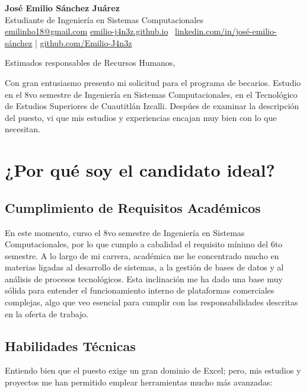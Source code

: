 \documentclass[letterpaper,11pt]{article}
\begin{document}
\begin{center}
\textbf{\Large José Emilio Sánchez Juárez} \\
\vspace{0.2cm}
Estudiante de Ingeniería en Sistemas Computacionales \\
\href{mailto:emilinho18@gmail. com}{emilinho18@gmail.com} \href{https://emilio-j4n3z.github.io}{emilio-j4n3z.github.io} \
\href{https://linkedin.com/in/josé-emilio-sánchez}{linkedin.com/in/josé-emilio-sánchez} | \href{https://github.com/Emilio-J4n3z}{github.com/Emilio-J4n3z}
\end{center}

\vspace{0.5cm}

\noindent Estimados responsables de Recursos Humanos,

Con gran entusiasmo presento mi solicitud para el programa de becarios. Estudio en el 8vo semestre de Ingeniería en Sistemas Computacionales, en el Tecnológico de Estudios Superiores de Cuautitlán Izcalli. Despúes de examinar la descripción del puesto, vi que mis estudios y experiencias encajan muy bien con lo que necesitan.


\section*{¿Por qué soy el candidato ideal? }

\subsection*{Cumplimiento de Requisitos Académicos}
En este momento, curso el 8vo semestre de Ingeniería en Sistemas Computacionales, por lo que cumplo a cabalidad el requisito mínimo del 6to semestre. A lo largo de mi carrera, académica me he concentrado mucho en materias ligadas al desarrollo de sistemas, a la gestión de bases de datos y al análisis de procesos tecnológicos. Esta inclinación me ha dado una base muy sólida para entender el funcionamiento interno de plataformas comerciales complejas, algo que veo esencial para cumplir con las responsabilidades descritas en la oferta de trabajo.

\subsection*{Habilidades Técnicas}
Entiendo bien que el puesto exige un gran dominio de Excel; pero, mis estudios y proyectos me han permitido emplear herramientas mucho más avanzadas:
\end{document}
